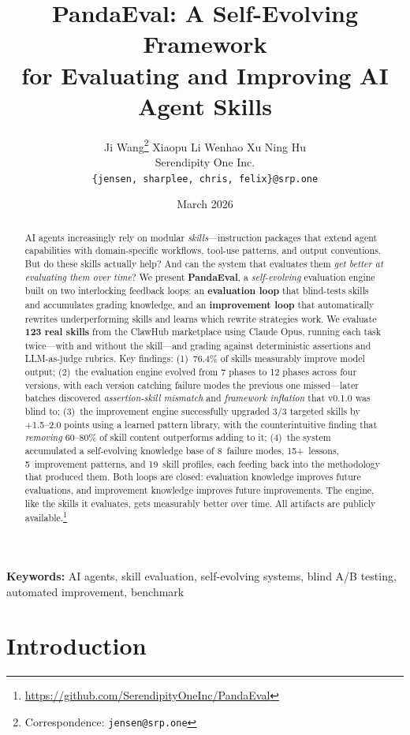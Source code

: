 \documentclass[11pt,a4paper]{article}
\title{%
\textbf{PandaEval: A Self-Evolving Framework\\for Evaluating and Improving AI Agent Skills}
}
\author{
Ji Wang\thanks{Correspondence: \texttt{jensen@srp.one}} \quad
Xiaopu Li \quad
Wenhao Xu \quad
Ning Hu \\[4pt]
Serendipity One Inc. \\
\texttt{\{jensen, sharplee, chris, felix\}@srp.one}
}
\date{March 2026}
\begin{document}
\maketitle

\begin{abstract}
AI agents increasingly rely on modular \emph{skills}---instruction packages that extend agent capabilities with domain-specific workflows, tool-use patterns, and output conventions.
But do these skills actually help? And can the system that evaluates them \emph{get better at evaluating them over time}?
We present \textbf{PandaEval}, a \emph{self-evolving} evaluation engine built on two interlocking feedback loops: an \textbf{evaluation loop} that blind-tests skills and accumulates grading knowledge, and an \textbf{improvement loop} that automatically rewrites underperforming skills and learns which rewrite strategies work.
We evaluate \textbf{123 real skills} from the ClawHub marketplace using Claude Opus, running each task twice---with and without the skill---and grading against deterministic assertions and LLM-as-judge rubrics.
Key findings: (1)~76.4\% of skills measurably improve model output; (2)~the evaluation engine evolved from 7 phases to 12 phases across four versions, with each version catching failure modes the previous one missed---later batches discovered \emph{assertion-skill mismatch} and \emph{framework inflation} that v0.1.0 was blind to; (3)~the improvement engine successfully upgraded 3/3 targeted skills by +1.5--2.0 points using a learned pattern library, with the counterintuitive finding that \emph{removing} 60--80\% of skill content outperforms adding to it; (4)~the system accumulated a self-evolving knowledge base of 8~failure modes, 15+~lessons, 5~improvement patterns, and 19~skill profiles, each feeding back into the methodology that produced them.
Both loops are closed: evaluation knowledge improves future evaluations, and improvement knowledge improves future improvements. The engine, like the skills it evaluates, gets measurably better over time.
All artifacts are publicly available.\footnote{\url{https://github.com/SerendipityOneInc/PandaEval}}
\end{abstract}

\noindent\textbf{Keywords:} AI agents, skill evaluation, self-evolving systems, blind A/B testing, automated improvement, benchmark

\section{Introduction}
\label{sec:intro}
\end{document}
